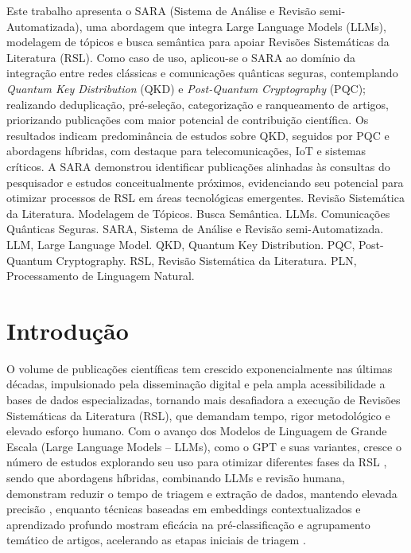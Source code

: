 \documentclass{siintec}
\author[#1]{\siintecauthorfont #2}
\begin{document}

\siintecabstract
{Este trabalho apresenta o SARA (Sistema de Análise e Revisão semi-Automatizada), uma abordagem que integra Large Language Models (LLMs), modelagem de tópicos e busca semântica para apoiar Revisões Sistemáticas da Literatura (RSL). Como caso de uso, aplicou-se o SARA ao domínio da integração entre redes clássicas e comunicações quânticas seguras, contemplando \textit{Quantum Key Distribution} (QKD) e \textit{Post-Quantum Cryptography} (PQC); realizando deduplicação, pré-seleção, categorização e ranqueamento de artigos, priorizando publicações com maior potencial de contribuição científica. Os resultados indicam predominância de estudos sobre QKD, seguidos por PQC e abordagens híbridas, com destaque para telecomunicações, IoT e sistemas críticos. A SARA demonstrou identificar publicações alinhadas às consultas do pesquisador e estudos conceitualmente próximos, evidenciando seu potencial para otimizar processos de RSL em áreas tecnológicas emergentes.}
{Revisão Sistemática da Literatura. Modelagem de Tópicos. Busca Semântica. LLMs. Comunicações Quânticas Seguras.}
{SARA, Sistema de Análise e Revisão semi-Automatizada. LLM, Large Language Model. QKD, Quantum Key Distribution. PQC, Post-Quantum Cryptography. RSL, Revisão Sistemática da Literatura. PLN, Processamento de Linguagem Natural.}



\section{Introdução}
O volume de publicações científicas tem crescido exponencialmente nas últimas décadas, impulsionado pela disseminação digital e pela ampla acessibilidade a bases de dados especializadas, tornando mais desafiadora a execução de Revisões Sistemáticas da Literatura (RSL), que demandam tempo, rigor metodológico e elevado esforço humano. Com o avanço dos Modelos de Linguagem de Grande Escala (Large Language Models – LLMs), como o GPT e suas variantes, cresce o número de estudos explorando seu uso para otimizar diferentes fases da RSL \cite{scherbakov2025emergence_RSL}, sendo que abordagens híbridas, combinando LLMs e revisão humana, demonstram reduzir o tempo de triagem e extração de dados, mantendo elevada precisão \cite{yehybrid_RSL}, enquanto técnicas baseadas em embeddings contextualizados e aprendizado profundo mostram eficácia na pré-classificação e agrupamento temático de artigos, acelerando as etapas iniciais de triagem \cite{alchokr2022supporting_RSL}.
\end{document}
